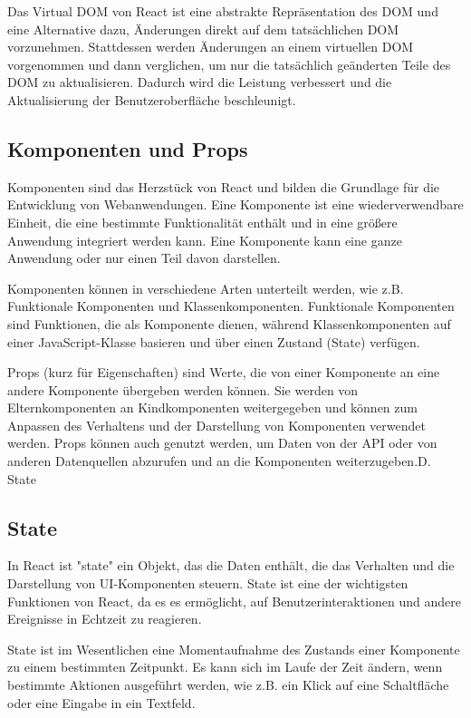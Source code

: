 Das Virtual DOM von React ist eine abstrakte Repräsentation des DOM und eine Alternative dazu, Änderungen direkt auf dem tatsächlichen DOM vorzunehmen. Stattdessen werden Änderungen an einem virtuellen DOM vorgenommen und dann verglichen, um nur die tatsächlich geänderten Teile des DOM zu aktualisieren. Dadurch wird die Leistung verbessert und die Aktualisierung der Benutzeroberfläche beschleunigt.


\subsection{Komponenten und Props}
Komponenten sind das Herzstück von React und bilden die Grundlage für die Entwicklung von Webanwendungen. Eine Komponente ist eine wiederverwendbare Einheit, die eine bestimmte Funktionalität enthält und in eine größere Anwendung integriert werden kann. Eine Komponente kann eine ganze Anwendung oder nur einen Teil davon darstellen.

Komponenten können in verschiedene Arten unterteilt werden, wie z.B. Funktionale Komponenten und Klassenkomponenten. Funktionale Komponenten sind Funktionen, die als Komponente dienen, während Klassenkomponenten auf einer JavaScript-Klasse basieren und über einen Zustand (State) verfügen.

Props (kurz für Eigenschaften) sind Werte, die von einer Komponente an eine andere Komponente übergeben werden können. Sie werden von Elternkomponenten an Kindkomponenten weitergegeben und können zum Anpassen des Verhaltens und der Darstellung von Komponenten verwendet werden. Props können auch genutzt werden, um Daten von der API oder von anderen Datenquellen abzurufen und an die Komponenten weiterzugeben.D. State


\subsection{State}
In React ist "state" ein Objekt, das die Daten enthält, die das Verhalten und die Darstellung von UI-Komponenten steuern. State ist eine der wichtigsten Funktionen von React, da es es ermöglicht, auf Benutzerinteraktionen und andere Ereignisse in Echtzeit zu reagieren.

State ist im Wesentlichen eine Momentaufnahme des Zustands einer Komponente zu einem bestimmten Zeitpunkt. Es kann sich im Laufe der Zeit ändern, wenn bestimmte Aktionen ausgeführt werden, wie z.B. ein Klick auf eine Schaltfläche oder eine Eingabe in ein Textfeld.

